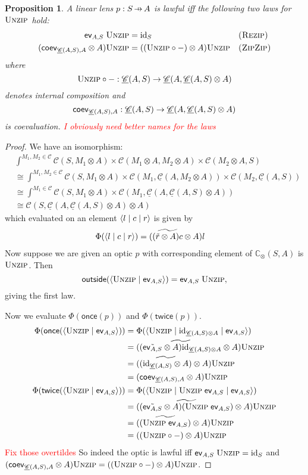\documentclass[11pt,a4paper]{article}
\theoremstyle{plain}
\newtheorem{proposition}[theorem]{Proposition}
\theoremstyle{definition}
\newcommand{\C}{\mathscr{C}}
\newcommand{\homC}{\underline{\C}}
\newcommand{\conc}{\mathbb{C}}
\newcommand{\id}{\mathrm{id}}
\newcommand{\rep}[2]{{\ensuremath \left\langle #1 \mid #2 \right\rangle}}
\newcommand{\repthree}[3]{{\ensuremath \langle #1 \mid #2 \mid #3 \rangle}}
\newcommand{\funzip}{\textsc{Unzip}}
\newcommand{\outside}{\mathsf{outside}}
\newcommand{\once}{\mathsf{once}}
\newcommand{\twice}{\mathsf{twice}}
\newcommand{\hto}{\ensuremath{\,\mathaccent\shortmid\rightarrow\,}}
\newcommand{\todo}[1]{\textcolor{red}{\small #1}}
\begin{document}
\begin{proposition}
  A linear lens $p : S \hto A$ is lawful iff the following two laws for $\funzip$ hold:
  \begin{align*}
    \ev_{A, S} \; \funzip &= \id_S && \textsc{(Rezip)} \\
    (\coev_{\homC(A, S), A} \otimes A)\funzip &= ((\funzip \circ -) \otimes A)\funzip && \textsc{(ZipZip)}
  \end{align*}
  where \[ \funzip \circ - : \homC(A, S) \to \homC(A, \homC(A, S) \otimes A) \] denotes internal composition and \[\coev_{\homC(A, S), A} : \homC(A, S) \to \homC(A, \homC(A, S) \otimes A)\] is coevaluation.
  \todo{I obviously need better names for the laws}
\end{proposition}
\begin{proof}
  We have an isomorphism:
  \begin{align*}
    & \int^{M_1, M_2 \in \C} \C(S, M_1 \otimes A) \times \C(M_1 \otimes A, M_2 \otimes A) \times \C(M_2 \otimes A, S) \\
    &\cong \int^{M_1, M_2 \in \C} \C(S, M_1 \otimes A) \times \C(M_1, \homC(A, M_2 \otimes A)) \times \C(M_2, \homC(A, S)) \\
    &\cong \int^{M_1 \in \C} \C(S, M_1 \otimes A) \times \C(M_1, \homC(A, \homC(A, S) \otimes A)) \\
    &\cong \C(S, \homC(A, \homC(A, S) \otimes A) \otimes A)
  \end{align*}
  which evaluated on an element $\repthree{l}{c}{r }$ is given by
  \begin{align*}
    \Phi(\repthree{l}{c}{r}) &= (\widetilde{(\tilde{r} \otimes A)c} \otimes A)l
  \end{align*}
  Now suppose we are given an optic $p$ with corresponding element of $\conc_\otimes(S, A)$ is $\funzip$. Then \[\outside(\rep{\funzip }{\ev_{A, S} }) = \ev_{A, S} \; \funzip,\] giving the first law.

  Now we evaluate $\Phi(\once(p))$ and $\Phi(\twice(p))$.
  \begin{align*}
    \Phi(\once(\rep{\funzip }{\ev_{A, S} }))
    &= \Phi(\repthree{\funzip }{\id_{\homC(A,S) \otimes A}}{\ev_{A, S} }) \\
    &= (\widetilde{(\tilde{\ev_{A, S}} \otimes A)\id_{\homC(A,S) \otimes A}} \otimes A)\funzip \\
    &= (\widetilde{(\id_{\homC(A, S)} \otimes A)} \otimes A)\funzip \\
    &= (\coev_{\homC(A, S), A} \otimes A)\funzip \\
    \Phi(\twice(\rep{\funzip }{\ev_{A, S} }))
    &= \Phi(\repthree{\funzip }{\funzip \; \ev_{A, S}}{\ev_{A, S} }) \\
    &= (\widetilde{(\tilde{\ev_{A, S}} \otimes A)(\funzip \; \ev_{A, S})} \otimes A)\funzip \\
    &= (\widetilde{(\funzip \; \ev_{A, S})} \otimes A)\funzip \\
    &= ((\funzip \circ -) \otimes A)\funzip
  \end{align*}
  \todo{Fix those overtildes}
  So indeed the optic is lawful iff $\ev_{A, S} \; \funzip = \id_S$ and $(\coev_{\homC(A, S), A} \otimes A)\funzip = ((\funzip \circ -) \otimes A)\funzip$.
\end{proof}
\end{document}
